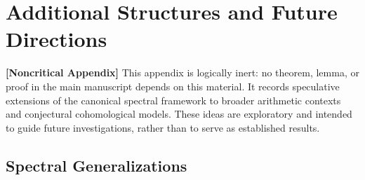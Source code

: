 \section{Additional Structures and Future Directions}
\label{app:additional_structures}

\noindent\textbf{[Noncritical Appendix]}  
This appendix is logically inert: no theorem, lemma, or proof in the main manuscript depends on this material. It records speculative extensions of the canonical spectral framework to broader arithmetic contexts and conjectural cohomological models. These ideas are exploratory and intended to guide future investigations, rather than to serve as established results.

\subsection*{Spectral Generalizations}

